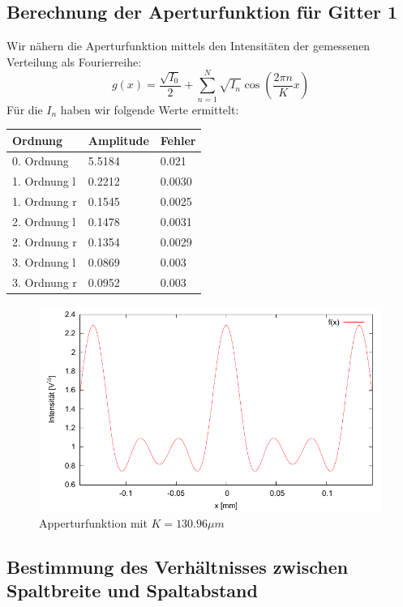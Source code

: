 \subsection{Berechnung der Aperturfunktion f\"ur Gitter 1}

Wir nähern die Aperturfunktion mittels den Intensit\"aten der gemessenen Verteilung als Fourierreihe:
$$g(x) = \frac{\sqrt{I_0}}{2} + \sum_{n=1}^N \sqrt{I_n}\cos\left(\frac{2\pi n}{K}x \right)$$
F\"ur die $I_n$ haben wir folgende Werte ermittelt:

\begin{tabular}{lll}
 \toprule
Ordnung & Amplitude & Fehler \\
\midrule
0. Ordnung   & 5.5184 & 0.021 \\
1. Ordnung l & 0.2212 & 0.0030 \\
1. Ordnung r & 0.1545 & 0.0025 \\
2. Ordnung l & 0.1478 & 0.0031 \\
2. Ordnung r & 0.1354 & 0.0029 \\
3. Ordnung l & 0.0869 & 0.003 \\
3. Ordnung r & 0.0952 & 0.003 \\
\bottomrule
\end{tabular}


\begin{figure}[!h]
 \includegraphics{Bilder/appertur.pdf}
\caption{Apperturfunktion mit $K = 130.96 \mu m $}
\end{figure}


\subsection{Bestimmung des Verh\"altnisses zwischen Spaltbreite und Spaltabstand}

